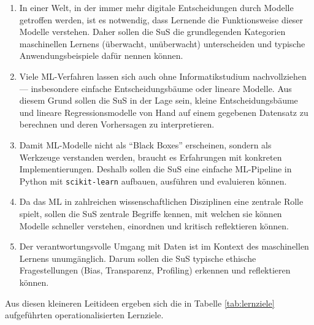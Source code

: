 \documentclass[twocolumn]{article}
\begin{document}
\begin{enumerate}[itemsep=0.3em, parsep=0pt, topsep=0em]
  \item In einer Welt, in der immer mehr digitale Entscheidungen durch Modelle getroffen werden, ist es notwendig, dass Lernende die Funktionsweise dieser Modelle verstehen. Daher sollen die SuS die grundlegenden Kategorien maschinellen Lernens (überwacht, unüberwacht) unterscheiden und typische Anwendungsbeispiele dafür nennen können.

  \item Viele ML-Verfahren lassen sich auch ohne Informatikstudium nachvollziehen — insbesondere einfache Entscheidungsbäume oder lineare Modelle.  Aus diesem Grund sollen die SuS in der Lage sein, kleine Entscheidungsbäume und lineare Regressionsmodelle von Hand auf einem gegebenen Datensatz zu berechnen und deren Vorhersagen zu interpretieren.

  \item Damit ML-Modelle nicht als ``Black Boxes'' erscheinen, sondern als Werkzeuge verstanden werden, braucht es Erfahrungen mit konkreten Implementierungen.  Deshalb sollen die SuS eine einfache ML-Pipeline in Python mit \texttt{scikit-learn} aufbauen, ausführen und evaluieren können.

  \item Da das ML in zahlreichen wissenschaftlichen Disziplinen eine zentrale Rolle spielt, sollen die SuS zentrale Begriffe kennen, mit welchen sie können Modelle schneller verstehen, einordnen und kritisch reflektieren können.

  \item Der verantwortungsvolle Umgang mit Daten ist im Kontext des maschinellen Lernens unumgänglich. Darum sollen die SuS typische ethische Fragestellungen (Bias, Transparenz, Profiling) erkennen und reflektieren können.
\end{enumerate}

Aus diesen kleineren Leitideen ergeben sich die in Tabelle \ref{tab:lernziele} aufgeführten operationalisierten Lernziele.
\end{document}
